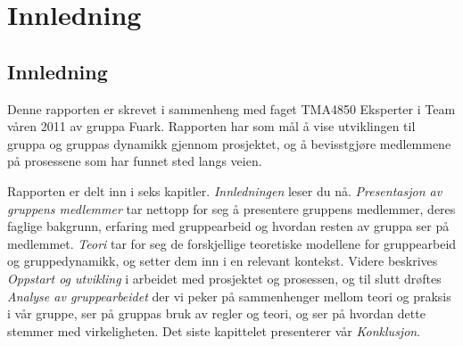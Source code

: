 \chapter{Innledning}
\fancyhead{}
\section*{Innledning}
Denne rapporten er skrevet i sammenheng med faget TMA4850 Eksperter i Team våren
2011 av gruppa Fu\th ark. Rapporten har som mål å vise utviklingen til gruppa
og gruppas dynamikk gjennom prosjektet, og å bevisstgjøre medlemmene på
prosessene som har funnet sted langs veien.

Rapporten er delt inn i seks kapitler. \emph{Innledningen} leser du nå.
\emph{Presentasjon av gruppens medlemmer} tar nettopp for seg å presentere
gruppens medlemmer, deres faglige bakgrunn, erfaring med gruppearbeid og hvordan
resten av gruppa ser på medlemmet. \emph{Teori} tar for seg de forskjellige
teoretiske modellene for gruppearbeid og gruppedynamikk, og setter dem inn i en
relevant kontekst. Videre beskrives \emph{Oppstart og utvikling} i arbeidet med
prosjektet og prosessen, og til slutt drøftes \emph{Analyse av gruppearbeidet}
der vi peker på sammenhenger mellom teori og praksis i vår gruppe, ser på
gruppas bruk av regler og teori, og ser på hvordan dette stemmer med
virkeligheten. Det siste kapittelet presenterer vår \emph{Konklusjon}.
